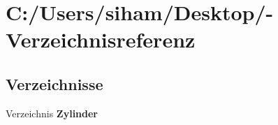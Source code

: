 \section{C:/Users/siham/Desktop/-Verzeichnisreferenz}
\label{dir_C_3A_2FUsers_2Fsiham_2FDesktop_2F}


\subsection*{Verzeichnisse}
\begin{CompactItemize}
\item 
Verzeichnis {\bf Zylinder}
\end{CompactItemize}
